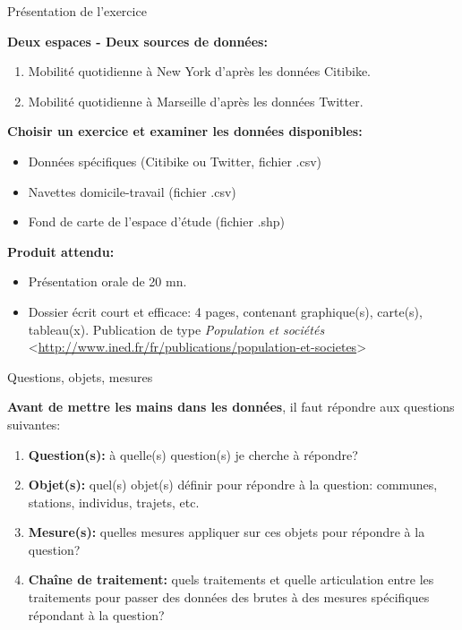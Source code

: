 \documentclass{beamer}
\begin{document}
\begin{frame}{Présentation de l'exercice}

\textbf{Deux espaces - Deux sources de données:}

\begin{enumerate}
  \item Mobilité quotidienne à New York d'après les données Citibike.
  \item Mobilité quotidienne à Marseille d'après les données Twitter.
\end{enumerate}

\textbf{Choisir un exercice et examiner les données disponibles:}

\begin{itemize}
  \item Données spécifiques (Citibike ou Twitter, fichier .csv)
  \item Navettes domicile-travail (fichier .csv)
  \item Fond de carte de l'espace d'étude (fichier .shp)
\end{itemize}

\textbf{Produit attendu:}

\begin{itemize}
  \item Présentation orale de 20 mn.
  \item Dossier écrit court et efficace: 4 pages, contenant graphique(s), carte(s), tableau(x). Publication de type \textit{Population et sociétés} \footnotesize <\url{http://www.ined.fr/fr/publications/population-et-societes}> \normalsize
\end{itemize}

\end{frame}



\begin{frame}{Questions, objets, mesures}

\textbf{Avant de mettre les mains dans les données}, il faut répondre aux questions suivantes:

\begin{enumerate}
  \item \textbf{Question(s):} à quelle(s) question(s) je cherche à répondre? 
  \item \textbf{Objet(s):} quel(s) objet(s) définir pour répondre à la question: communes, stations, individus, trajets, etc.
  \item \textbf{Mesure(s):} quelles mesures appliquer sur ces objets pour répondre à la question?
  \item \textbf{Chaîne de traitement:} quels traitements et quelle articulation entre les traitements pour passer des données des brutes à des mesures spécifiques répondant à la question?
\end{enumerate}

\end{frame}
\end{document}
